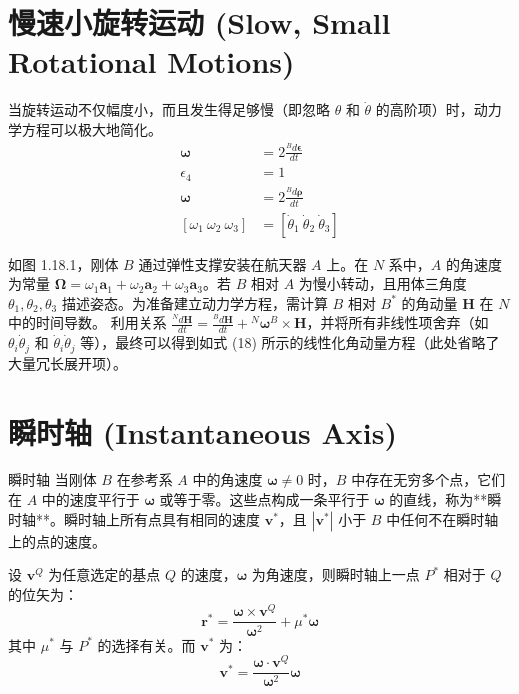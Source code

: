 \section{慢速小旋转运动 (Slow, Small Rotational Motions)}

当旋转运动不仅幅度小，而且发生得足够慢（即忽略 \(\theta\) 和 \(\dot{\theta}\) 的高阶项）时，动力学方程可以极大地简化。
\begin{align}
\boldsymbol{\omega} &= 2 \frac{{}^B d\boldsymbol{\epsilon}}{dt} \tag{1} \\
\epsilon_4 &= 1 \tag{2} \\
\boldsymbol{\omega} &= 2 \frac{{}^B d\boldsymbol{\rho}}{dt} \tag{3} \\
[\omega_1 \ \omega_2 \ \omega_3] &= [\dot{\theta}_1 \ \dot{\theta}_2 \ \dot{\theta}_3] \tag{4}
\end{align}

\begin{example}[慢小运动的动力学预备推导]
如图 1.18.1，刚体 \(B\) 通过弹性支撑安装在航天器 \(A\) 上。在 \(N\) 系中，\(A\) 的角速度为常量 \(\boldsymbol{\Omega} = \omega_1 \mathbf{a}_1 + \omega_2 \mathbf{a}_2 + \omega_3 \mathbf{a}_3\)。若 \(B\) 相对 \(A\) 为慢小转动，且用体三角度 \(\theta_1, \theta_2, \theta_3\) 描述姿态。为准备建立动力学方程，需计算 \(B\) 相对 \(B^*\) 的角动量 \(\mathbf{H}\) 在 \(N\) 中的时间导数。
利用关系 \(\frac{{}^N d\mathbf{H}}{dt} = \frac{{}^B d\mathbf{H}}{dt} + {}^N \boldsymbol{\omega}^B \times \mathbf{H}\)，并将所有非线性项舍弃（如 \(\theta_i \dot{\theta}_j\) 和 \(\dot{\theta}_i \dot{\theta}_j\) 等），最终可以得到如式 (18) 所示的线性化角动量方程（此处省略了大量冗长展开项）。
\end{example}

\section{瞬时轴 (Instantaneous Axis)}

\begin{mydefinition}{瞬时轴}
当刚体 \(B\) 在参考系 \(A\) 中的角速度 \(\boldsymbol{\omega} \neq 0\) 时，\(B\) 中存在无穷多个点，它们在 \(A\) 中的速度平行于 \(\boldsymbol{\omega}\) 或等于零。这些点构成一条平行于 \(\boldsymbol{\omega}\) 的直线，称为**瞬时轴**。瞬时轴上所有点具有相同的速度 \(\mathbf{v}^*\)，且 \(|\mathbf{v}^*|\) 小于 \(B\) 中任何不在瞬时轴上的点的速度。
\end{mydefinition}

设 \(\mathbf{v}^Q\) 为任意选定的基点 \(Q\) 的速度，\(\boldsymbol{\omega}\) 为角速度，则瞬时轴上一点 \(P^*\) 相对于 \(Q\) 的位矢为：
\begin{equation}
\mathbf{r}^* = \frac{\boldsymbol{\omega} \times \mathbf{v}^Q}{\boldsymbol{\omega}^2} + \mu^* \boldsymbol{\omega} \tag{1}
\end{equation}
其中 \(\mu^*\) 与 \(P^*\) 的选择有关。而 \(\mathbf{v}^*\) 为：
\begin{equation}
\mathbf{v}^* = \frac{\boldsymbol{\omega} \cdot \mathbf{v}^Q}{\boldsymbol{\omega}^2} \boldsymbol{\omega} \tag{2}
\end{equation}


